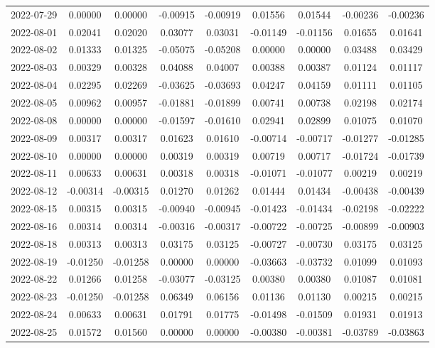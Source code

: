 \begin{footnotesize}
\begin{longtable}{lcccccccc}
2022-07-29 & 0.00000 & 0.00000 & -0.00915 & -0.00919 & 0.01556 & 0.01544 & -0.00236 & -0.00236 \\
2022-08-01 & 0.02041 & 0.02020 & 0.03077 & 0.03031 & -0.01149 & -0.01156 & 0.01655 & 0.01641 \\
2022-08-02 & 0.01333 & 0.01325 & -0.05075 & -0.05208 & 0.00000 & 0.00000 & 0.03488 & 0.03429 \\
2022-08-03 & 0.00329 & 0.00328 & 0.04088 & 0.04007 & 0.00388 & 0.00387 & 0.01124 & 0.01117 \\
2022-08-04 & 0.02295 & 0.02269 & -0.03625 & -0.03693 & 0.04247 & 0.04159 & 0.01111 & 0.01105 \\
2022-08-05 & 0.00962 & 0.00957 & -0.01881 & -0.01899 & 0.00741 & 0.00738 & 0.02198 & 0.02174 \\
2022-08-08 & 0.00000 & 0.00000 & -0.01597 & -0.01610 & 0.02941 & 0.02899 & 0.01075 & 0.01070 \\
2022-08-09 & 0.00317 & 0.00317 & 0.01623 & 0.01610 & -0.00714 & -0.00717 & -0.01277 & -0.01285 \\
2022-08-10 & 0.00000 & 0.00000 & 0.00319 & 0.00319 & 0.00719 & 0.00717 & -0.01724 & -0.01739 \\
2022-08-11 & 0.00633 & 0.00631 & 0.00318 & 0.00318 & -0.01071 & -0.01077 & 0.00219 & 0.00219 \\
2022-08-12 & -0.00314 & -0.00315 & 0.01270 & 0.01262 & 0.01444 & 0.01434 & -0.00438 & -0.00439 \\
2022-08-15 & 0.00315 & 0.00315 & -0.00940 & -0.00945 & -0.01423 & -0.01434 & -0.02198 & -0.02222 \\
2022-08-16 & 0.00314 & 0.00314 & -0.00316 & -0.00317 & -0.00722 & -0.00725 & -0.00899 & -0.00903 \\
2022-08-18 & 0.00313 & 0.00313 & 0.03175 & 0.03125 & -0.00727 & -0.00730 & 0.03175 & 0.03125 \\
2022-08-19 & -0.01250 & -0.01258 & 0.00000 & 0.00000 & -0.03663 & -0.03732 & 0.01099 & 0.01093 \\
2022-08-22 & 0.01266 & 0.01258 & -0.03077 & -0.03125 & 0.00380 & 0.00380 & 0.01087 & 0.01081 \\
2022-08-23 & -0.01250 & -0.01258 & 0.06349 & 0.06156 & 0.01136 & 0.01130 & 0.00215 & 0.00215 \\
2022-08-24 & 0.00633 & 0.00631 & 0.01791 & 0.01775 & -0.01498 & -0.01509 & 0.01931 & 0.01913 \\
2022-08-25 & 0.01572 & 0.01560 & 0.00000 & 0.00000 & -0.00380 & -0.00381 & -0.03789 & -0.03863 \\

\end{longtable}
\end{footnotesize}

